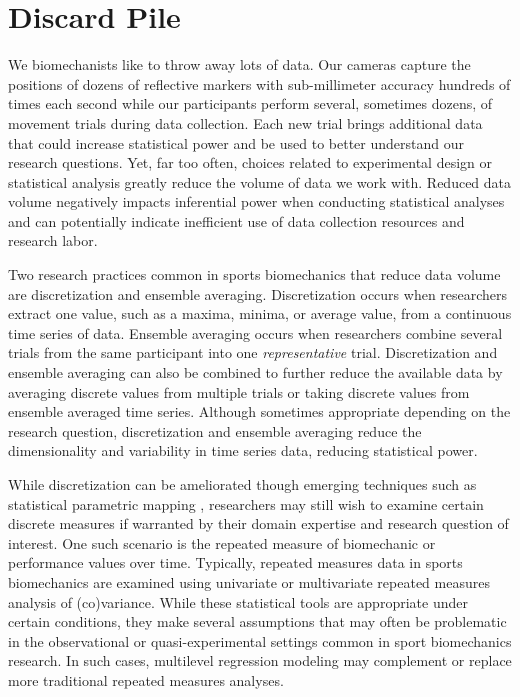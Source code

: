 \documentclass[
]{article}
\begin{document}
\hypertarget{discard-pile}{%
\section{Discard Pile}\label{discard-pile}}

We biomechanists like to throw away lots of data. Our cameras capture the positions of dozens of reflective markers with sub-millimeter accuracy hundreds of times each second while our participants perform several, sometimes dozens, of movement trials during data collection. Each new trial brings additional data that could increase statistical power and be used to better understand our research questions. Yet, far too often, choices related to experimental design or statistical analysis greatly reduce the volume of data we work with. Reduced data volume negatively impacts inferential power when conducting statistical analyses and can potentially indicate inefficient use of data collection resources and research labor.

Two research practices common in sports biomechanics that reduce data volume are discretization and ensemble averaging. Discretization occurs when researchers extract one value, such as a maxima, minima, or average value, from a continuous time series of data. Ensemble averaging occurs when researchers combine several trials from the same participant into one \emph{representative} trial. Discretization and ensemble averaging can also be combined to further reduce the available data by averaging discrete values from multiple trials or taking discrete values from ensemble averaged time series. Although sometimes appropriate depending on the research question, discretization and ensemble averaging reduce the dimensionality and variability in time series data, reducing statistical power.

While discretization can be ameliorated though emerging techniques such as statistical parametric mapping \cite{pataky2019}, researchers may still wish to examine certain discrete measures if warranted by their domain expertise and research question of interest. One such scenario is the repeated measure of biomechanic or performance values over time. Typically, repeated measures data in sports biomechanics are examined using univariate or multivariate repeated measures analysis of (co)variance. While these statistical tools are appropriate under certain conditions, they make several assumptions that may often be problematic in the observational or quasi-experimental settings common in sport biomechanics research. In such cases, multilevel regression modeling may complement or replace more traditional repeated measures analyses.
\end{document}
